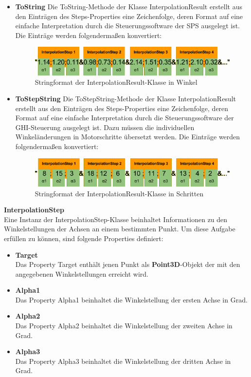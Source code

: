 \begin{itemize}
\item \textbf{ToString}
Die ToString-Methode der Klasse InterpolationResult erstellt aus den Einträgen des Steps-Properties eine Zeichenfolge, deren Format auf eine einfache Interpretation durch die Steuerungssoftware der SPS ausgelegt ist. Die Einträge werden folgendermaßen konvertiert:\\
\begin{figure}[H]
  \centering
  \begin{minipage}[t]{12 cm}
  	\centering
  	\includegraphics[width=12cm]{images/InterpolationResult} 
    \caption{Stringformat der InterpolationResult-Klasse in Winkel}
  \end{minipage}
\end{figure}
\item \textbf{ToStepString}
Die ToStepString-Methode der Klasse InterpolationResult erstellt aus den Einträgen des Steps-Properties eine Zeichenfolge, deren Format auf eine einfache Interpretation durch die Steuerungssoftware der GHI-Steuerung ausgelegt ist. Dazu müssen die individuellen Winkeländerungen in Motorschritte übersetzt werden. Die Einträge werden folgendermaßen konvertiert:\\
\begin{figure}[H]
  \centering
  \begin{minipage}[t]{12 cm}
  	\centering
  	\includegraphics[width=12cm]{images/InterpolationResult2} 
    \caption{Stringformat der InterpolationResult-Klasse in Schritten}
  \end{minipage}
\end{figure}
\end{itemize}
\textbf{InterpolationStep}\\
Eine Instanz der InterpolationStep-Klasse beinhaltet Informationen zu den Winkelstellungen der Achsen an einem bestimmten Punkt. Um diese Aufgabe erfüllen zu können, sind folgende Properties definiert:
\begin{itemize}
\item \textbf{Target}\\
Das Property Target enthält jenen Punkt als \textbf{Point3D}-Objekt der mit den angegebenen Winkelstellungen erreicht wird.
\item \textbf{Alpha1}\\
Das Property Alpha1 beinhaltet die Winkelstellung der ersten Achse in Grad.
\item \textbf{Alpha2}\\
Das Property Alpha2 beinhaltet die Winkelstellung der zweiten Achse in Grad.
\item \textbf{Alpha3}\\
Das Property Alpha3 beinhaltet die Winkelstellung der dritten Achse in Grad.
\end{itemize} 
